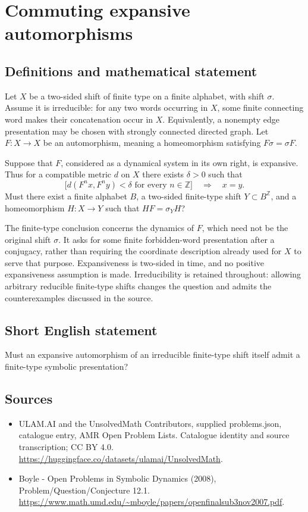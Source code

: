 \documentclass[11pt,a4paper]{article}
\begin{document}
\section*{Commuting expansive automorphisms}\label{statement}

\subsection{Definitions and mathematical statement}
Let $X$ be a two-sided shift of finite type on a finite alphabet, with shift
$\sigma$. Assume it is irreducible: for any two words occurring in $X$,
some finite connecting word makes their concatenation occur in $X$.
Equivalently, a nonempty edge presentation may be chosen with strongly
connected directed graph. Let $F:X\to X$ be an automorphism, meaning a
homeomorphism satisfying $F\sigma=\sigma F$.

Suppose that $F$, considered as a dynamical system in its own right, is
expansive. Thus for a compatible metric $d$ on $X$ there exists
$\delta>0$ such that
\[
 \bigl[d(F^n x,F^n y)<\delta\text{ for every }n\in\mathbb Z\bigr]
 \quad\Longrightarrow\quad x=y.
\]
Must there exist a finite alphabet $B$, a two-sided finite-type shift
$Y\subset B^{\mathbb Z}$, and a homeomorphism $H:X\to Y$ such that
$HF=\sigma_YH$?

The finite-type conclusion concerns the dynamics of $F$, which need not
be the original shift $\sigma$. It asks for some finite forbidden-word
presentation after a conjugacy, rather than requiring the coordinate
description already used for $X$ to serve that purpose. Expansiveness is
two-sided in time, and no positive expansiveness assumption is made.
Irreducibility is retained throughout: allowing arbitrary reducible
finite-type shifts changes the question and admits the counterexamples
discussed in the source.
\subsection{Short English statement}
Must an expansive automorphism of an irreducible finite-type shift itself admit a finite-type symbolic presentation?
\subsection{Sources}
\begin{itemize}
\item[S1] ULAM.AI and the UnsolvedMath Contributors, supplied problems.json, catalogue entry, AMR Open Problem Lists. Catalogue identity and source transcription; CC BY 4.0.
\url{https://huggingface.co/datasets/ulamai/UnsolvedMath}.
\item[S2] Boyle - Open Problems in Symbolic Dynamics (2008), Problem/Question/Conjecture 12.1. 
\url{https://www.math.umd.edu/~mboyle/papers/openfinalsub3nov2007.pdf}.
\end{itemize}
\end{document}
